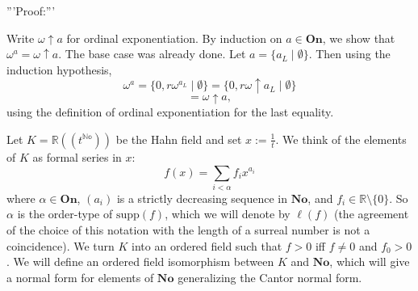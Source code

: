 '''Proof:'''

Write $\omega\uparrow a$ for ordinal exponentiation. By induction on $a\in \mathbf{On}$, we show that $\omega^a=\omega\uparrow a$. The base case was already done. Let $a=\{a_L\mid \emptyset\}$. Then using the induction hypothesis,
$$\omega^a=\{0,r\omega^{a_L}\mid \emptyset\}=\{0,r\omega\uparrow a_L\mid\emptyset\}$$
$$=\omega\uparrow a,$$
using the definition of ordinal exponentiation for the last equality.


Let $K=\mathbb{R}((t^\mathbb{No}))$ be the Hahn field and set $x:=\frac{1}{t}$. We think of the elements of $K$ as formal series in $x$:
$$f(x)=\sum_{i<\alpha}f_ix^{a_i}$$
where $\alpha\in \mathbf{On}$, $(a_i)$ is a strictly decreasing sequence in $\mathbf{No}$, and $f_i\in \mathbb{R}\setminus \{0\}$. So $\alpha$ is the order-type of $\mathrm{supp}(f)$, which we will denote by $\ell(f)$ (the agreement of the choice of this notation with the length of a surreal number is not a coincidence). We turn $K$ into an ordered field such that $f>0$ iff $f\neq 0$ and $f_0>0$. We will define an ordered field isomorphism between $K$ and $\mathbf{No}$, which will give a normal form for elements of $\mathbf{No}$ generalizing the Cantor normal form.
